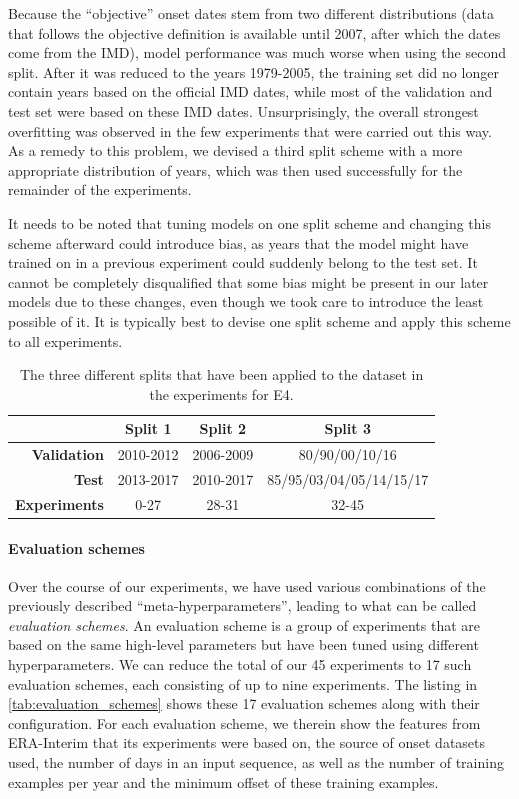 Because the ``objective'' onset dates stem from two different distributions (data that follows the objective definition is available until 2007, after which the dates come from the IMD), model performance was much worse when using the second split. After it was reduced to the years 1979-2005, the training set did no longer contain years based on the official IMD dates, while most of the validation and test set were based on these IMD dates. Unsurprisingly, the overall strongest overfitting was observed in the few experiments that were carried out this way. As a remedy to this problem, we devised a third split scheme with a more appropriate distribution of years, which was then used successfully for the remainder of the experiments.

It needs to be noted that tuning models on one split scheme and changing this scheme afterward could introduce bias, as years that the model might have trained on in a previous experiment could suddenly belong to the test set. It cannot be completely disqualified that some bias might be present in our later models due to these changes, even though we took care to introduce the least possible of it. It is typically best to devise one split scheme and apply this scheme to all experiments.

\begin{table}[h]
  \centering
  \begin{tabular}{rccc}
    \toprule
    & \textbf{Split 1} & \textbf{Split 2} & \textbf{Split 3} \\
    \midrule
    \textbf{Validation} & 2010-2012 & 2006-2009 & 80/90/00/10/16 \\
    \textbf{Test} & 2013-2017 & 2010-2017 & 85/95/03/04/05/14/15/17 \\
    \midrule
    \textbf{Experiments} & 0-27 & 28-31 & 32-45 \\
    \bottomrule
  \end{tabular}
  \caption{The three different splits that have been applied to the dataset in the experiments for E4.}
  \label{tab:train_test_split}
\end{table}

\paragraph{Evaluation schemes}
Over the course of our experiments, we have used various combinations of the previously described ``meta-hyperparameters'', leading to what can be called \textit{evaluation schemes}. An evaluation scheme is a group of experiments that are based on the same high-level parameters but have been tuned using different hyperparameters. We can reduce the total of our 45 experiments to 17 such evaluation schemes, each consisting of up to nine experiments. The listing in \cref{tab:evaluation_schemes} shows these 17 evaluation schemes along with their configuration. For each evaluation scheme, we therein show the features from ERA-Interim that its experiments were based on, the source of onset datasets used, the number of days in an input sequence, as well as the number of training examples per year and the minimum offset of these training examples.

